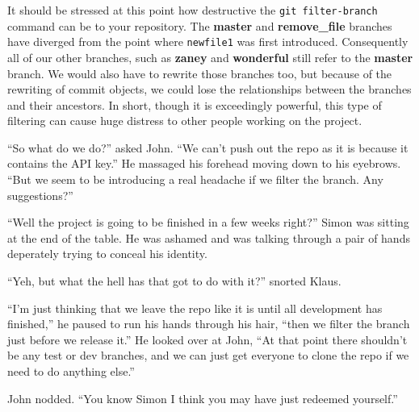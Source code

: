 It should be stressed at this point how destructive the \texttt{git filter-branch} command can be to your repository.
The \textbf{master} and \textbf{remove\_file} branches have diverged from the point where \texttt{newfile1} was first introduced.
Consequently all of our other branches, such as \textbf{zaney} and \textbf{wonderful} still refer to the \textbf{master} branch.
We would also have to rewrite those branches too, but because of the rewriting of commit objects, we could lose the relationships between the branches and their ancestors.
In short, though it is exceedingly powerful, this type of filtering can cause huge distress to other people working on the project.

\begin{trenches}
``So what do we do?'' asked John.
``We can't push out the repo as it is because it contains the API key.''
He massaged his forehead moving down to his eyebrows.
``But we seem to be introducing a real headache if we filter the branch. Any suggestions?''

``Well the project is going to be finished in a few weeks right?'' Simon was sitting at the end of the table.
He was ashamed and was talking through a pair of hands deperately trying to conceal his identity.

``Yeh, but what the hell has that got to do with it?'' snorted Klaus.

``I'm just thinking that we leave the repo like it is until all development has finished,'' he paused to run his hands through his hair,
``then we filter the branch just before we release it.''
He looked over at John, ``At that point there shouldn't be any test or dev branches, and we can just get everyone to clone the repo if we need to do anything else.''

John nodded.  ``You know Simon I think you may have just redeemed yourself.''
\end{trenches}

